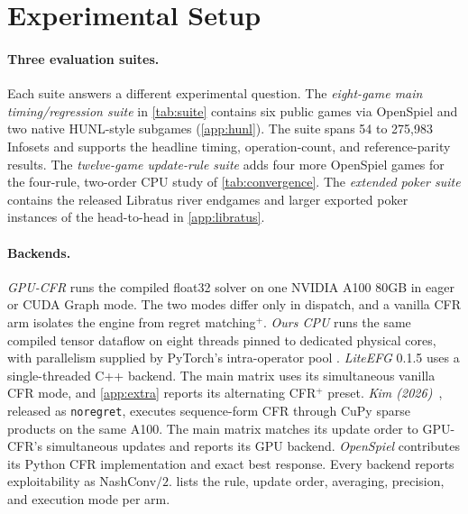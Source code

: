 \section{Experimental Setup}
\label{sec:setup}

\paragraph{Three evaluation suites.}
Each suite answers a different experimental question. The \emph{eight-game main
timing/regression suite} in \cref{tab:suite} contains six public games via OpenSpiel
\cite{lanctot2019openspiel} and two native HUNL-style subgames
\cite{ganzfried2015endgame,brown2017safe} (\cref{app:hunl}). The suite spans 54 to
275{,}983 Infosets and supports the headline timing, operation-count, and
reference-parity results. The \emph{twelve-game update-rule suite} adds four more
OpenSpiel games for the four-rule, two-order CPU study of \cref{tab:convergence}. The
\emph{extended poker suite} contains the released Libratus river endgames \cite{brown2018superhuman,steinberger2019pokerrl} and larger
exported poker instances of the head-to-head in \cref{app:libratus}.




\paragraph{Backends.}
\emph{GPU-CFR} runs the compiled float32 solver on one NVIDIA A100 80GB in eager or
CUDA Graph mode. The two modes differ only in dispatch, and a vanilla CFR arm isolates
the engine from regret matching$^{+}$. \emph{Ours CPU} runs the same compiled tensor dataflow on eight threads
pinned to dedicated physical cores, with parallelism supplied by PyTorch's
intra-operator pool \cite{paszke2019pytorch}. \emph{LiteEFG} 0.1.5 \cite{liu2024liteefg} uses a single-threaded C++ backend. The
main matrix uses its simultaneous vanilla CFR mode, and \cref{app:extra} reports its
alternating CFR$^{+}$ preset. \emph{Kim (2026)}~\cite{kim2026parallelizing},
released as \texttt{noregret}, executes sequence-form
\cite{koller1997representations} CFR through CuPy sparse products on the same A100. The main matrix matches its update order
to GPU-CFR's simultaneous updates and reports its GPU backend. \emph{OpenSpiel} \cite{lanctot2019openspiel} contributes its Python CFR
implementation and exact best response. Every backend reports exploitability as NashConv$/2$.  lists
the rule, update order, averaging, precision, and execution mode per arm.

